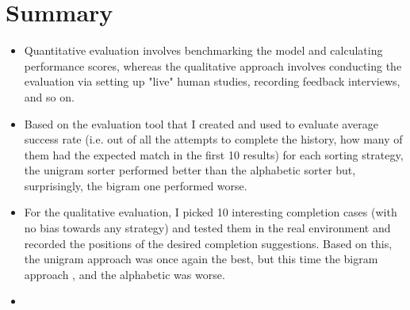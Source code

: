 \section{Summary}
\label{sec:Evaluation-Summary}
\begin{itemize}
    \item Quantitative evaluation involves benchmarking the model and calculating performance scores, whereas the qualitative approach involves conducting the evaluation via setting up "live" human studies, recording feedback interviews, and so on.
    \item Based on the evaluation tool that I created and used to evaluate average success rate (i.e. out of all the attempts to complete the history, how many of them had the expected match in the first 10 results) for each sorting strategy, the unigram sorter performed better than the alphabetic sorter but, surprisingly, the bigram one performed worse.
    \item For the qualitative evaluation, I picked 10 interesting completion cases (with no bias towards any strategy) and tested them in the real environment and recorded the positions of the desired completion suggestions. Based on this, the unigram approach was once again the best, but this time the bigram approach , and the alphabetic was worse.
    \item {} 
\end{itemize}